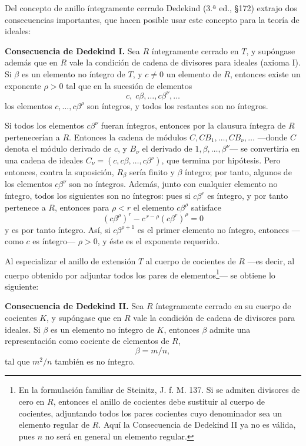 \documentclass[11pt]{article}
\begin{document}
Del concepto de anillo íntegramente cerrado Dedekind (3.ª ed., §172) extrajo dos consecuencias importantes, que hacen posible usar este concepto para la teoría de ideales:

\medskip
\noindent\textbf{Consecuencia de Dedekind I.} Sea $R$ íntegramente cerrado en $T$, y supóngase además que en $R$ vale la condición de cadena de divisores para ideales (axioma I). Si $\beta$ es un elemento no íntegro de $T$, y $c\ne0$ un elemento de $R$, entonces existe un exponente $\rho>0$ tal que en la sucesión de elementos
\[
        c,\;c\beta,\ldots,c\beta^\nu,\ldots
\]
los elementos $c,\ldots,c\beta^\rho$ son íntegros, y todos los restantes son no íntegros.

Si todos los elementos $c\beta^\nu$ fueran íntegros, entonces por la clausura íntegra de $R$ pertenecerían a $R$. Entonces la cadena de módulos $C,CB_1,\ldots,CB_\nu,\ldots$ ---donde $C$ denota el módulo derivado de $c$, y $B_\nu$ el derivado de $1,\beta,\ldots,\beta^\nu$--- se convertiría en una cadena de ideales $C_\nu=(c,c\beta,\ldots,c\beta^\nu)$, que termina por hipótesis. Pero entonces, contra la suposición, $R_\beta$ sería finito y $\beta$ íntegro; por tanto, algunos de los elementos $c\beta^\nu$ son no íntegros. Además, junto con cualquier elemento no íntegro, todos los siguientes son no íntegros: pues si $c\beta^r$ es íntegro, y por tanto pertenece a $R$, entonces para $\rho<r$ el elemento $c\beta^\rho$ satisface
\[
        (c\beta^\rho)^r-c^{\,r-\rho}(c\beta^r)^\rho=0
\]
y es por tanto íntegro. Así, si $c\beta^{\rho+1}$ es el primer elemento no íntegro, entonces ---como $c$ es íntegro--- $\rho>0$, y éste es el exponente requerido.

Al especializar el anillo de extensión $T$ al cuerpo de cocientes de $R$ ---es decir, al cuerpo obtenido por adjuntar todos los pares de elementos\footnote{En la formulación familiar de Steinitz, J. f. M. 137. Si se admiten divisores de cero en $R$, entonces el anillo de cocientes debe sustituir al cuerpo de cocientes, adjuntando todos los pares cocientes cuyo denominador sea un elemento regular de $R$. Aquí la Consecuencia de Dedekind II ya no es válida, pues $n$ no será en general un elemento regular.}--- se obtiene lo siguiente:

\medskip
\noindent\textbf{Consecuencia de Dedekind II.} Sea $R$ íntegramente cerrado en su cuerpo de cocientes $K$, y supóngase que en $R$ vale la condición de cadena de divisores para ideales. Si $\beta$ es un elemento no íntegro de $K$, entonces $\beta$ admite una representación como cociente de elementos de $R$,
\[
        \beta=m/n,
\]
tal que $m^2/n$ también es no íntegro.
\end{document}

